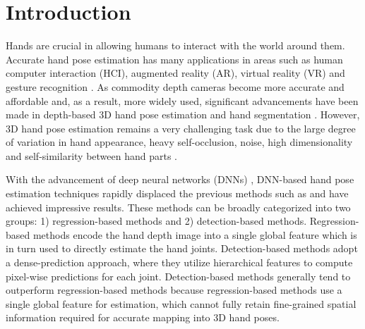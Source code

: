 \documentclass{article}
\begin{document}
\section{Introduction}
Hands are crucial in allowing humans to interact with the world around them. Accurate hand pose estimation has many applications in areas such as human computer interaction (HCI), augmented reality (AR), virtual reality (VR) and gesture recognition \cite{b1,b2,b3}. As commodity depth cameras become more accurate and affordable and, as a result, more widely used, significant advancements have been made in depth-based 3D hand pose estimation \cite{yuan2018depth,malik2020handvoxnet,chen2019so,du2019crossinfonet,xiong2019a2j,ge2018point,wan2018dense,baek2018augmented} and hand segmentation \cite{tompson2014real,bojja2019handseg}. However, 3D hand pose estimation remains a very challenging task due to the large degree of variation in hand appearance, heavy self-occlusion, noise,  high dimensionality and self-similarity between hand parts \cite{du2019crossinfonet,ge2018hand,ge2018point,moon2018v2v}.
\par
With the advancement of deep neural networks (DNNs) \cite{b7}, DNN-based hand pose estimation techniques rapidly displaced the previous methods such as \cite{keskin2012hand,oikonomidis2011efficient} and have achieved impressive results. These methods can be broadly categorized into two groups: 1)  regression-based methods and 2) detection-based methods. Regression-based methods \cite{ge2018hand,oberweger2015hands,poier2019murauer} encode the hand depth image into a single global feature which is in turn used to directly estimate the hand joints. Detection-based methods adopt a dense-prediction approach, where they utilize hierarchical features to compute pixel-wise predictions for each joint. Detection-based methods generally tend to outperform regression-based methods \cite{yuan2018depth} because regression-based methods use a single global feature for estimation, which cannot fully retain fine-grained spatial information required for accurate mapping into 3D hand poses. 
\par
\end{document}
